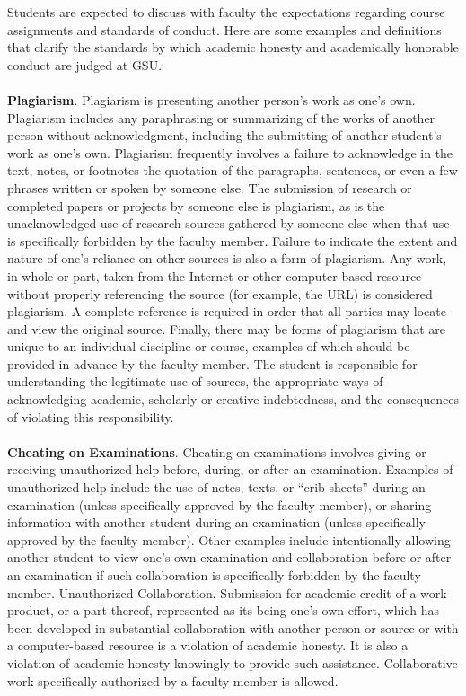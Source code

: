 \documentclass{article}
\begin{document}
Students are expected to discuss with faculty the expectations regarding course assignments and standards of conduct. Here are some examples and deﬁnitions that clarify the standards by which academic honesty and academically honorable conduct are judged at GSU.\\
\\
\textbf{Plagiarism}. Plagiarism is presenting another person’s work as one’s own. Plagiarism includes any paraphrasing or summarizing of the works of another person without acknowledgment, including the submitting of another student’s work as one’s own. Plagiarism frequently involves a failure to acknowledge in the text, notes, or footnotes the quotation of the paragraphs, sentences, or even a few phrases written or spoken by someone else. The submission of research or completed papers or projects by someone else is plagiarism, as is the unacknowledged use of research sources gathered by someone else when that use is speciﬁcally forbidden by the faculty member. Failure to indicate the extent and nature of one’s reliance on other sources is also a form of plagiarism. Any work, in whole or part, taken from the Internet or other computer based resource without properly referencing the source (for example, the URL) is considered plagiarism. A complete reference is required in order that all parties may locate and view the original source. Finally, there may be forms of plagiarism that are unique to an individual discipline or course, examples of which should be provided in advance by the faculty member. The student is responsible for understanding the legitimate use of sources, the appropriate ways of acknowledging academic, scholarly or creative indebtedness, and the consequences of violating this responsibility.\\
\\
\textbf{Cheating on Examinations}. Cheating on examinations involves giving or receiving unauthorized help before, during, or after an examination. Examples of unauthorized help include the use of notes, texts, or “crib sheets” during an examination (unless speciﬁcally approved by the faculty member), or sharing information with another student during an examination (unless speciﬁcally approved by the faculty member). Other examples include intentionally allowing another student to view one’s own examination and collaboration before or after an examination if such collaboration is speciﬁcally forbidden by the faculty member. Unauthorized Collaboration. Submission for academic credit of a work product, or a part thereof, represented as its being one’s own eﬀort, which has been developed in substantial collaboration with another person or source or with a computer-based resource is a violation of academic honesty. It is also a violation of academic honesty knowingly to provide such assistance. Collaborative work speciﬁcally authorized by a faculty member is allowed.\\
\end{document}
